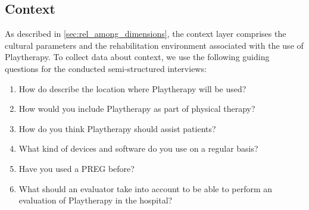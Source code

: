 \begin{table}[bth]
\caption{Conducted evaluation sessions to evaluate the antecedents of Playtherapy}
\myfloatalign
{}
\label{tab:antecedents_evaluations}
\end{table}

\subsection{Context}
As described in \autoref{sec:rel_among_dimensions}, the context layer comprises the cultural parameters and the rehabilitation environment associated with the use of Playtherapy. To collect data about context, we use the following guiding questions for the conducted semi-structured interviews:

\begin{enumerate}
    \item How do describe the location where Playtherapy will be used?
    \item How would you include Playtherapy as part of physical therapy?
    \item How do you think Playtherapy should assist patients?
    \item What kind of devices and software do you use on a regular basis?
    \item Have you used a \ac{PREG} before?
    \item What should an evaluator take into account to be able to perform an evaluation of Playtherapy in the hospital?
\end{enumerate}

